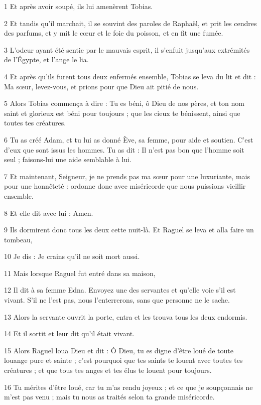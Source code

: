 
\par 1 Et après avoir soupé, ils lui amenèrent Tobias.
\par 2 Et tandis qu'il marchait, il se souvint des paroles de Raphaël, et prit les cendres des parfums, et y mit le cœur et le foie du poisson, et en fit une fumée.
\par 3 L'odeur ayant été sentie par le mauvais esprit, il s'enfuit jusqu'aux extrémités de l'Égypte, et l'ange le lia.
\par 4 Et après qu'ils furent tous deux enfermés ensemble, Tobias se leva du lit et dit : Ma sœur, levez-vous, et prions pour que Dieu ait pitié de nous.
\par 5 Alors Tobias commença à dire : Tu es béni, ô Dieu de nos pères, et ton nom saint et glorieux est béni pour toujours ; que les cieux te bénissent, ainsi que toutes tes créatures.
\par 6 Tu as créé Adam, et tu lui as donné Ève, sa femme, pour aide et soutien. C'est d'eux que sont issus les hommes. Tu as dit : Il n'est pas bon que l'homme soit seul ; faisons-lui une aide semblable à lui.
\par 7 Et maintenant, Seigneur, je ne prends pas ma sœur pour une luxuriante, mais pour une honnêteté : ordonne donc avec miséricorde que nous puissions vieillir ensemble.
\par 8 Et elle dit avec lui : Amen.
\par 9 Ils dormirent donc tous les deux cette nuit-là. Et Raguel se leva et alla faire un tombeau,
\par 10 Je dis : Je crains qu'il ne soit mort aussi.
\par 11 Mais lorsque Raguel fut entré dans sa maison,
\par 12 Il dit à sa femme Edna. Envoyez une des servantes et qu'elle voie s'il est vivant. S'il ne l'est pas, nous l'enterrerons, sans que personne ne le sache.
\par 13 Alors la servante ouvrit la porte, entra et les trouva tous les deux endormis.
\par 14 Et il sortit et leur dit qu'il était vivant.
\par 15 Alors Raguel loua Dieu et dit : Ô Dieu, tu es digne d'être loué de toute louange pure et sainte ; c'est pourquoi que tes saints te louent avec toutes tes créatures ; et que tous tes anges et tes élus te louent pour toujours.
\par 16 Tu mérites d'être loué, car tu m'as rendu joyeux ; et ce que je soupçonnais ne m'est pas venu ; mais tu nous as traités selon ta grande miséricorde.
